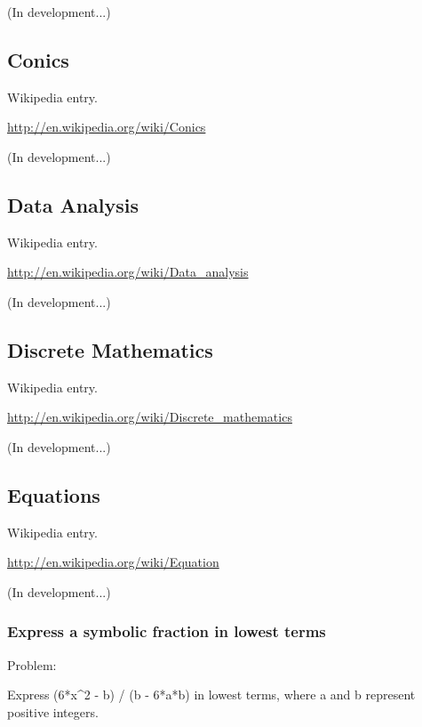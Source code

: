 \documentclass[12pt,oneside]{book}
\begin{document}
(In development...)

\subsection[Conics]{Conics}

Wikipedia entry.

\href{http://en.wikipedia.org/wiki/Conics}{http://en.wikipedia.org/wiki/Conics}

(In development...)

\subsection[Data Analysis]{Data Analysis}

Wikipedia entry.

\href{http://en.wikipedia.org/wiki/Data_analysis}{http://en.wikipedia.org/wiki/Data\_analysis}

(In development...)

\subsection[Discrete Mathematics ]{Discrete Mathematics }

Wikipedia entry.

\href{http://en.wikipedia.org/wiki/Discrete_mathematics}{http://en.wikipedia.org/wiki/Discrete\_mathematics}

(In development...)

\subsection[Equations]{Equations}

Wikipedia entry.

\href{http://en.wikipedia.org/wiki/Equation}{http://en.wikipedia.org/wiki/Equation}

(In development...)

\subsubsection[Express a symbolic fraction in lowest terms]{Express a symbolic fraction in lowest terms} 

{\textquotedbl}{\textquotedbl}{\textquotedbl}

Problem:

Express (6*x\^{}2 {}- b) / (b {}- 6*a*b) in lowest terms, where a and b represent positive integers. 
\end{document}
